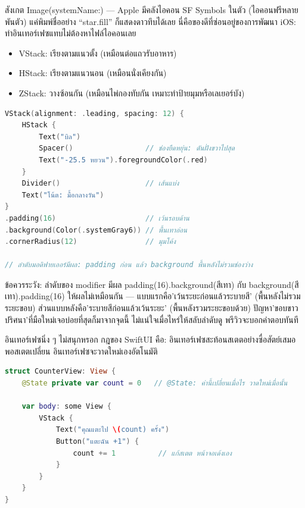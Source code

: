 สังเกต Image(systemName:) — Apple มีคลังไอคอน SF Symbols ในตัว (ไอคอนฟรีหลายพันตัว) แค่พิมพ์ชื่ออย่าง “star.fill” ก็แสดงดาวทึบได้เลย นี่คือของดีที่ซ่อนอยู่ของการพัฒนา iOS: ทำอินเทอร์เฟซแทบไม่ต้องหาไฟล์ไอคอนเลย


\begin{itemize}
  \item VStack: เรียงตามแนวตั้ง (เหมือนต่อแถวรับอาหาร)
  \item HStack: เรียงตามแนวนอน (เหมือนนั่งเคียงกัน)
  \item ZStack: วางซ้อนกัน (เหมือนไพ่กองทับกัน เหมาะทำป้ายมุมหรือเลเยอร์บัง)
\end{itemize}

\begin{lstlisting}[language=Swift]
VStack(alignment: .leading, spacing: 12) {
    HStack {
        Text("บิล")
        Spacer()                 // ช่องยืดหยุ่น: ดันฝั่งขวาไปสุด
        Text("-25.5 หยวน").foregroundColor(.red)
    }
    Divider()                    // เส้นแบ่ง
    Text("โน้ต: มื้อกลางวัน")
}
.padding(16)                     // เว้นรอบด้าน
.background(Color(.systemGray6)) // พื้นเทาอ่อน
.cornerRadius(12)                // มุมโค้ง

// ลำดับมอดิฟายเออร์มีผล: padding ก่อน แล้ว background พื้นหลังไม่รวมช่องว่าง
\end{lstlisting}

\begin{tcbwarn}{ข้อควรระวัง: ลำดับของ modifier มีผล}
padding(16).background(สีเทา) กับ background(สีเทา).padding(16) ให้ผลไม่เหมือนกัน — แบบแรกคือ'เว้นระยะก่อนแล้วระบายสี' (พื้นหลังไม่รวมระยะขอบ) ส่วนแบบหลังคือ'ระบายสีก่อนแล้วเว้นระยะ' (พื้นหลังรวมระยะขอบด้วย) ปัญหา'ขอบขาวปริศนา'ที่มือใหม่เจอบ่อยที่สุดก็มาจากจุดนี้ ไม่แน่ใจเมื่อไหร่ให้สลับลำดับดู พรีวิวจะบอกคำตอบทันที

\end{tcbwarn}


อินเทอร์เฟซนิ่ง ๆ ไม่สนุกหรอก กฎของ SwiftUI คือ: อินเทอร์เฟซสะท้อนสเตตอย่างซื่อสัตย์เสมอ พอสเตตเปลี่ยน อินเทอร์เฟซจะวาดใหม่เองอัตโนมัติ

\begin{lstlisting}[language=Swift]
struct CounterView: View {
    @State private var count = 0   // @State: ค่านี้เปลี่ยนเมื่อไร วาดใหม่เมื่อนั้น

    var body: some View {
        VStack {
            Text("คุณแตะไป \(count) ครั้ง")
            Button("แตะฉัน +1") {
                count += 1          // แก้สเตต หน้าจอเด้งเอง
            }
        }
    }
}
\end{lstlisting}

